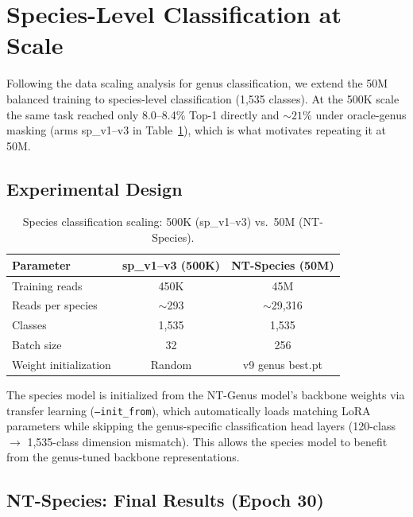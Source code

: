 \section{Species-Level Classification at Scale}
\label{sec:exp-species-scaled}

Following the data scaling analysis for genus classification, we extend the 50M balanced training to species-level classification (1{,}535 classes). At the 500K scale the same task reached only 8.0--8.4\% Top-1 directly and ${\sim}21\%$ under oracle-genus masking (arms sp\_v1--v3 in Table~\ref{tab:species-scaling}), which is what motivates repeating it at 50M.

\subsection{Experimental Design}

\begin{table}[htbp]
    \centering
    \caption{Species classification scaling: 500K (sp\_v1--v3) vs.\ 50M (NT-Species).}
    \label{tab:species-scaling}
    \begin{tabular}{lcc}
        \toprule
        \textbf{Parameter} & \textbf{sp\_v1--v3 (500K)} & \textbf{NT-Species (50M)} \\
        \midrule
        Training reads & 450K & 45M \\
        Reads per species & $\sim$293 & $\sim$29,316 \\
        Classes & 1,535 & 1,535 \\
        Batch size & 32 & 256 \\
        Weight initialization & Random & v9 genus best.pt \\
        \bottomrule
    \end{tabular}
\end{table}

The species model is initialized from the NT-Genus model's backbone weights via transfer learning (\texttt{--init\_from}), which automatically loads matching LoRA parameters while skipping the genus-specific classification head layers (120-class $\to$ 1,535-class dimension mismatch). This allows the species model to benefit from the genus-tuned backbone representations.

\subsection{NT-Species: Final Results (Epoch 30)}
\label{sec:spv4-final}

